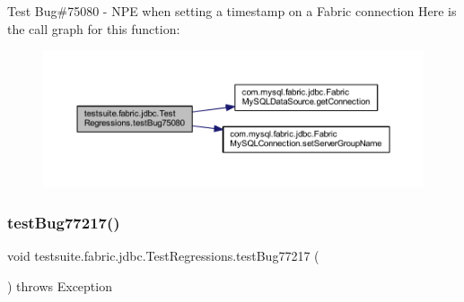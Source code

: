 Test Bug\#75080 -\/ N\+PE when setting a timestamp on a Fabric connection Here is the call graph for this function\+:
\nopagebreak
\begin{figure}[H]
\begin{center}
\leavevmode
\includegraphics[width=350pt]{classtestsuite_1_1fabric_1_1jdbc_1_1_test_regressions_a4e0d710d5707438a3ccd2dde61938f1c_cgraph}
\end{center}
\end{figure}
\mbox{\label{classtestsuite_1_1fabric_1_1jdbc_1_1_test_regressions_a3ce60c17f8f082b01d2d313de8a469e3}} 
\subsubsection{\texorpdfstring{test\+Bug77217()}{testBug77217()}}
{\footnotesize\ttfamily void testsuite.\+fabric.\+jdbc.\+Test\+Regressions.\+test\+Bug77217 (\begin{DoxyParamCaption}{ }\end{DoxyParamCaption}) throws Exception}

